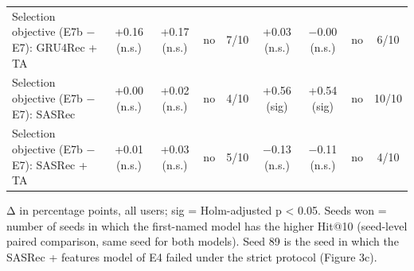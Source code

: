 \begin{table}[t]
\begin{tabular}{lcccccccc}
Selection objective (E7b $-$ E7): GRU4Rec + TA & +0.16 (n.s.) & +0.17 (n.s.) & no & 7/10 & +0.03 (n.s.) & $-$0.00 (n.s.) & no & 6/10 \\
Selection objective (E7b $-$ E7): SASRec & +0.00 (n.s.) & +0.02 (n.s.) & no & 4/10 & +0.56 (sig) & +0.54 (sig) & no & 10/10 \\
Selection objective (E7b $-$ E7): SASRec + TA & +0.01 (n.s.) & +0.03 (n.s.) & no & 5/10 & $-$0.13 (n.s.) & $-$0.11 (n.s.) & no & 4/10 \\
\bottomrule
\end{tabular}
\par\smallskip\footnotesize Δ in percentage points, all users; sig = Holm-adjusted p < 0.05. Seeds won = number of seeds in which the first-named model has the higher Hit@10 (seed-level paired comparison, same seed for both models). Seed 89 is the seed in which the SASRec + features model of E4 failed under the strict protocol (Figure 3c).
\end{table}